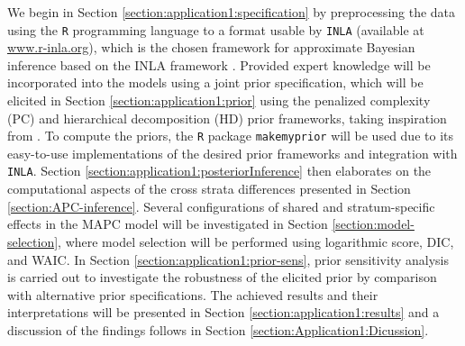 We begin in Section \ref{section:application1:specification} by preprocessing the data using the \texttt{R} programming language to a format usable by \texttt{INLA} (available at \url{www.r-inla.org}), which is the chosen framework for approximate Bayesian inference based on the INLA framework \citep{Original-INLA}. Provided expert knowledge will be incorporated into the models using a joint prior specification, which will be elicited in Section \ref{section:application1:prior} using the penalized complexity (PC) \citep{PC-priors} and hierarchical decomposition (HD) \citep{Jointprior} prior frameworks, taking inspiration from \cite{IngeborgGenetics}. To compute the priors, the \texttt{R} package \texttt{makemyprior} \citep{MMPPackage, MMP} will be used due to its easy-to-use implementations of the desired prior frameworks and integration with \texttt{INLA}. Section \ref{section:application1:posteriorInference} then elaborates on the computational aspects of the cross strata differences presented in Section \ref{section:APC-inference}. Several configurations of shared and stratum-specific effects in the MAPC model will be investigated in Section \ref{section:model-selection}, where model selection will be performed using logarithmic score, DIC, and WAIC. In Section \ref{section:application1:prior-sens}, prior sensitivity analysis is carried out to investigate the robustness of the elicited prior by comparison with alternative prior specifications. The achieved results and their interpretations will be presented in Section \ref{section:application1:results} and a discussion of the findings follows in Section \ref{section:Application1:Dicussion}. 


